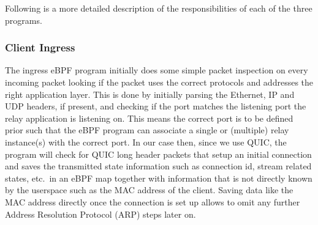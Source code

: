 Following is a more detailed description of the responsibilities of each of the three programs.
\subsubsection{Client Ingress} 
The ingress eBPF program initially does some simple packet inspection on every incoming packet 
looking if the packet uses the correct protocols and addresses the right application layer.
This is done by initially parsing the Ethernet, IP and UDP headers, if present, and checking if 
the port matches the listening port the relay application is listening on.
This means the correct port is to be defined prior such that the eBPF program can associate 
a single or (multiple) relay instance(s) with the correct port.
In our case then, since we use QUIC, the program will check for QUIC long header packets that 
setup an initial connection and saves the transmitted state information such as connection id, 
stream related states, etc.~in an eBPF map together with information that is not directly known
by the userspace such as the MAC address of the client.
Saving data like the MAC address directly once the connection is set up allows to omit any further 
Address Resolution Protocol (ARP) steps later on. 
